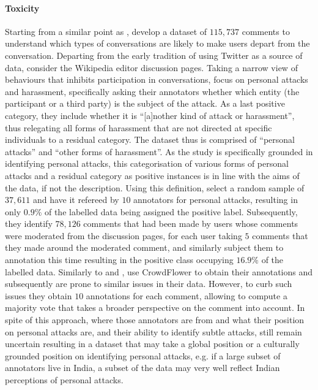 \paragraph*{Toxicity} Starting from a similar point as \citet{Davidson:2017}, \citet{Wulczyn:2017} develop a dataset  of $115,737$ comments to understand which types of conversations are likely to make users depart from the conversation. 
Departing from the early tradition of using Twitter as a source of data, \citet{Wulczyn:2017} consider the Wikipedia editor discussion pages. 
Taking a narrow view of behaviours that inhibits participation in conversations, \citet{Wulczyn:2017} focus on personal attacks and harassment, specifically asking their annotators whether which entity (the participant or a third party) is the subject of the attack. 
As a last positive category, they include whether it is ``[a]nother kind of attack or harassment'', thus relegating all forms of harassment that are not directed at specific individuals to a residual category. 
The dataset thus is comprised of ``personal attacks'' and ``other forms of harassment''. 
As the study is specifically grounded in identifying personal attacks, this categorisation of various forms of personal attacks and a residual category as positive instances is in line with the aims of the data, if not the description.
Using this definition, \citet{Wulczyn:2017} select a random sample of $37,611$ and have it refereed by $10$ annotators for personal attacks, resulting in only $0.9\%$ of the labelled data being assigned the positive label. 
Subsequently, they identify $78,126$ comments that had been made by users whose comments were moderated from the discussion pages, for each user taking $5$ comments that they made around the moderated comment, and similarly subject them to annotation this time resulting in the positive class occupying $16.9\%$ of the labelled data.
Similarly to \citet{Waseem:2016} and \citet{Davidson:2017}, \citet{Wulczyn:2017} use CrowdFlower to obtain their annotations and subsequently are prone to similar issues in their data. 
However, to curb such issues they obtain $10$ annotations for each comment, allowing to compute a majority vote that takes a broader perspective on the comment into account. 
In spite of this approach, where those annotators are from and what their position on personal attacks are, and their ability to identify subtle attacks, still remain uncertain resulting in a dataset that may take a global position or a culturally grounded position on identifying personal attacks, e.g. if a large subset of annotators live in India, a subset of the data may very well reflect Indian perceptions of personal attacks.
